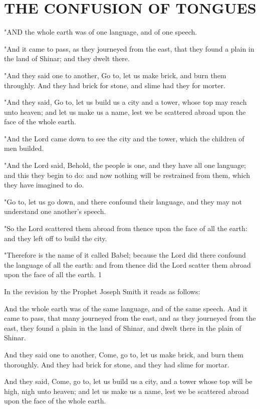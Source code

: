 \chapter{THE CONFUSION OF TONGUES}

"AND the whole earth was of one language, and of one speech.

"And it came to pass, as they journeyed from the east, that they found a plain in the land of
Shinar; and they dwelt there.

"And they said one to another, Go to, let us make brick, and burn them throughly. And they
had brick for stone, and slime had they for morter.

"And they said, Go to, let us build us a city and a tower, whose top may reach unto heaven;
and let us make us a name, lest we be scattered abroad upon the face of the whole earth.

"And the Lord came down to see the city and the tower, which the children of men builded.

"And the Lord said, Behold, the people is one, and they have all one language; and this they
begin to do: and now nothing will be restrained from them, which they have imagined to do.

"Go to, let us go down, and there confound their language, and they may not understand one
another's speech.

"So the Lord scattered them abroad from thence upon the face of all the earth: and they left
off to build the city.

"Therefore is the name of it called Babel; because the Lord did there confound the language
of all the earth: and from thence did the Lord scatter them abroad upon the face of all the
earth. 1

In the revision by the Prophet Joseph Smith it reads as follows:

And the whole earth was of the same language, and of the same speech. And it came to pass,
that many journeyed from the east, and as they journeyed from the east, they found a plain in
the land of Shinar, and dwelt there in the plain of Shinar.

And they said one to another, Come, go to, let us make brick, and burn them thoroughly. And
they had brick for stone, and they had slime for mortar.

And they said, Come, go to, let us build us a city, and a tower whose top will be high, nigh
unto heaven; and let us make us a name, lest we be scattered abroad upon the face of the
whole earth.

